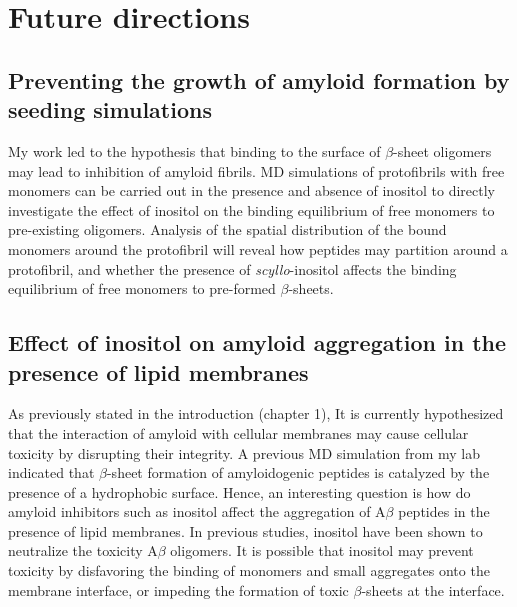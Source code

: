 \section{Future directions}


\subsection{Preventing the growth of amyloid formation by seeding simulations}
My work led to the hypothesis that binding to the surface of $\beta$-sheet oligomers may lead to inhibition of amyloid fibrils.  MD simulations of protofibrils with free monomers can be carried out in the presence and absence of inositol to directly investigate the effect of inositol on the binding equilibrium of free monomers to pre-existing oligomers.  Analysis of the spatial distribution of the bound monomers around the protofibril will reveal how peptides may partition around a protofibril, and whether the presence of \textit{scyllo}-inositol affects the binding equilibrium of free monomers to pre-formed $\beta$-sheets. %

\subsection{Effect of inositol on amyloid aggregation in the presence of lipid membranes}
As previously stated in the introduction (chapter 1), It is currently hypothesized that the interaction of amyloid with cellular membranes may cause cellular toxicity by disrupting their integrity.\cite{Pastor:2008p23}  A previous MD simulation from my lab indicated that $\beta$-sheet formation of amyloidogenic peptides is catalyzed by the presence of a hydrophobic surface.\cite{Nikolic:2010go}  Hence, an interesting question is how do amyloid inhibitors such as inositol affect the aggregation of A$\beta$ peptides in the presence of lipid membranes. In previous studies, inositol have been shown to neutralize the toxicity A$\beta$ oligomers.\cite{McLaurin:2000bq}  It is possible that inositol may prevent toxicity by disfavoring the binding of monomers and small aggregates onto the membrane interface, or impeding the formation of toxic $\beta$-sheets at the interface.

